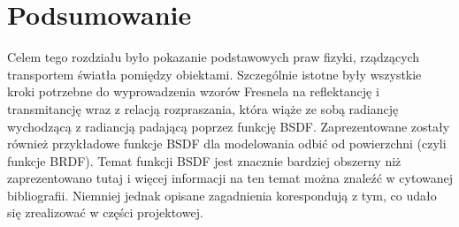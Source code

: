 \section{Podsumowanie}
Celem tego rozdziału było pokazanie podstawowych praw fizyki, rządzących transportem światła pomiędzy obiektami. Szczególnie istotne były wszystkie kroki potrzebne do wyprowadzenia wzorów Fresnela na reflektancję i transmitancję wraz z relacją rozpraszania, która wiąże ze sobą radiancję wychodzącą z radiancją padającą poprzez funkcję BSDF. Zaprezentowane zostały również przykładowe funkcje BSDF dla modelowania odbić od powierzchni (czyli funkcje BRDF). Temat funkcji BSDF jest znacznie bardziej obszerny niż zaprezentowano tutaj i więcej informacji na ten temat można znaleźć w cytowanej bibliografii. Niemniej jednak opisane zagadnienia korespondują z tym, co udało się zrealizować w części projektowej.

